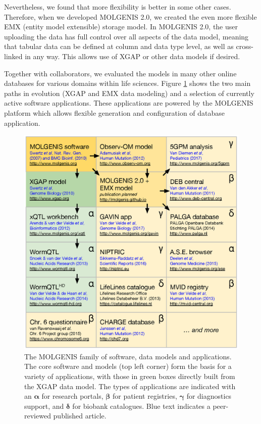 Nevertheless, we found that more flexibility is better in some other cases.
Therefore, when we developed MOLGENIS 2.0, we created the even more flexible EMX (entity model extensible) storage model.
In MOLGENIS 2.0, the user uploading the data has full control over all aspects of the data model, meaning that tabular data can be defined at column and data type level, as well as cross-linked in any way.
This allows use of XGAP or other data models if desired.

Together with collaborators, we evaluated the models in many other online databases for various domains within life sciences\cite{Adamusiak_2012}.
Figure \ref{fig:discussion_molgenisfamily} shows the two main paths in evolution (XGAP and EMX data modeling) and a selection of currently active software applications.
These applications are powered by the MOLGENIS platform which allows flexible generation and configuration of database application.

\begin{figure}
\centering
\includegraphics[scale=0.7]{img/discussion_molgenisfamily}
\caption[The MOLGENIS family of software]{The MOLGENIS family of software, data models and applications. The core software and models (top left corner) form the basis for a variety of applications, with those in green boxes directly built from the XGAP data model. The types of applications are indicated with an $\boldsymbol{\alpha}$ for research portals, $\boldsymbol{\beta}$ for patient registries, $\boldsymbol{\gamma}$ for diagnostics support, and $\boldsymbol{\delta}$ for biobank catalogues. Blue text indicates a peer-reviewed published article.}
\label{fig:discussion_molgenisfamily}
\end{figure}

